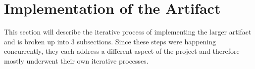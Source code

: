 \section{Implementation of the Artifact}

This section will describe the iterative process of implementing the larger artifact and is broken up into 3 subsections.
Since these steps were happening concurrently, they each address a different aspect of the project and therefore mostly underwent their own iterative processes.








